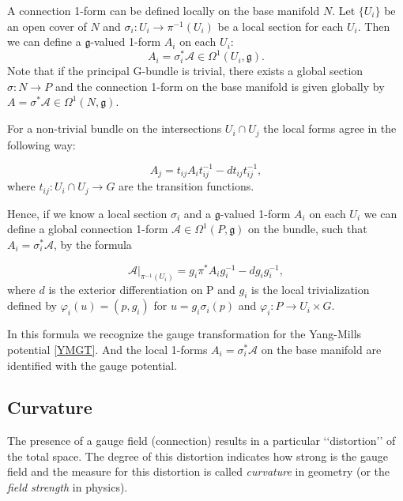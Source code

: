 \documentclass[11pt]{report}
\theoremstyle{plain}
\theoremstyle{definition}
\theoremstyle{remark}
\theoremstyle{remark}
\numberwithin{equation}{section}
\begin{document}
A connection 1-form can be defined locally on the base manifold $N$. Let $\{U_i\}$ be an open cover of $N$ and $\sigma_i: U_i \to \pi^{-1}(U_i)$ be a local section for each $U_i$. Then we can define a $\mathfrak{g}$-valued 1-form $A_i$ on each $U_i$:
\begin{equation}\label{local form}
A_i = \sigma_i^*\mathcal{A} \in \Omega^1(U_i, \mathfrak{g}).
\end{equation}
Note that if the principal G-bundle is trivial, there exists a global section $\sigma: N \to P$ and the connection 1-form on the base manifold is given globally by $A = \sigma^*\mathcal{A} \in \Omega^1(N, \mathfrak{g})$.

For a non-trivial bundle on the intersections $U_i\cap U_j$ the local forms agree in the following way:

 \begin{equation}
 A_j = t_{ij}A_it_{ij}^{-1} - dt_{ij}t_{ij}^{-1},
 \end{equation}
 where $t_{ij}: U_i \cap U_j \to G$ are the transition functions.
 
 Hence, if we know a local section $\sigma_i$ and a $\mathfrak{g}$-valued 1-form $A_i$ on each $U_i$ we can define a global connection 1-form $\mathcal{A} \in \Omega^1(P, \mathfrak{g})$ on the bundle, such that $A_i = \sigma_i^*\mathcal{A}$, by the formula
 
 \begin{equation}\label{CGT}
\mathcal{A}|_{\pi^{-1}(U_i)} = g_i\pi^*A_ig_i^{-1} - dg_i g_i^{-1},
\end{equation}
where $d$ is the exterior differentiation on P and $g_i$ is the local trivialization defined by  $\varphi_i(u) = (p, g_i)$ for $u=g_i\sigma_i(p)$ and $\varphi_i: P \to U_i\times G$.

 In this formula we recognize the gauge transformation for the Yang-Mills potential \eqref{YMGT}. And the local 1-forms $A_i = \sigma_i^*\mathcal{A}$ on the base manifold are identified with the gauge potential. 


\subsection{Curvature}

The presence of a gauge field (connection) results in a particular \lq\lq{}distortion\rq\rq{} of the total space. The degree of this distortion indicates how strong is the gauge field and the measure for this distortion is called \textit{curvature} in geometry (or the \textit{field strength} in physics). 
\end{document}

